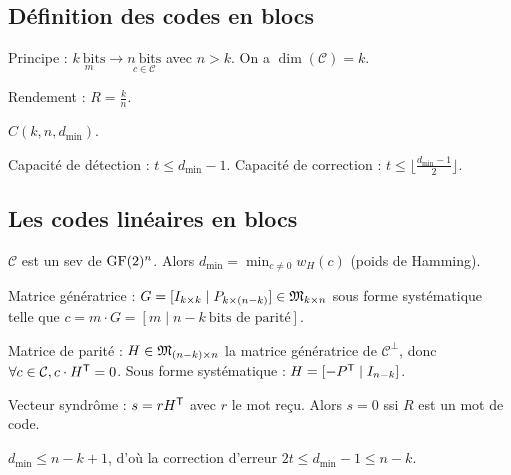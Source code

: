 \subsection{Définition des codes en blocs}

	Principe : $\underset{m}{k\ \text{bits}} \longrightarrow \underset{c \in \mathcal{C}}{n\ \text{bits}}$ avec $n > k$.
	On a $\dim(\mathcal{C}) = k$.
	
	\begin{defn}
		Rendement : $R = \frac{k}{n}$.
	\end{defn}
	
	\begin{note}
		$C(k,n,d_{\min})$.
	\end{note}
	
	\begin{defn}
		Capacité de détection : $t \leq d_{\min} - 1$. Capacité de correction : $t \leq \lfloor \frac{d_{\min} - 1}{2} \rfloor$.
	\end{defn}
	
\subsection{Les codes linéaires en blocs}

	$\mathcal{C}$ est un sev de $\mathrm{GF}(2)^n$.
	Alors $d_{\min} = \min_{c \neq 0} w_H(c)$ (poids de Hamming).

	\begin{defn}
		Matrice génératrice : $G = [ I_{k \times k} \mid P_{k \times (n - k)} ] \in \mathfrak{M}_{k \times n}$ sous forme systématique telle que $c = m \cdot G = [ m \mid n - k\ \text{bits de parité}]$.
	\end{defn}

	\begin{defn}
		Matrice de parité : $H \in \mathfrak{M}_{(n - k) \times n}$ la matrice génératrice de $\mathcal{C}^\perp$, donc $\forall c \in \mathcal{C}, c \cdot H^\mathsf{T} = 0$.
		Sous forme systématique : $H = [ -P^\mathsf{T} \mid I_{n - k}]$.
	\end{defn}

	\begin{defn}
		Vecteur syndrôme : $s = r H^\mathsf{T}$ avec $r$ le mot reçu.
		Alors $s = 0$ ssi $R$ est un mot de code.
	\end{defn}

	\begin{thm}
		$d_{\min} \leq n - k + 1$, d'où la correction d'erreur $2t \leq d_{\min} - 1 \leq n - k$.
	\end{thm}

